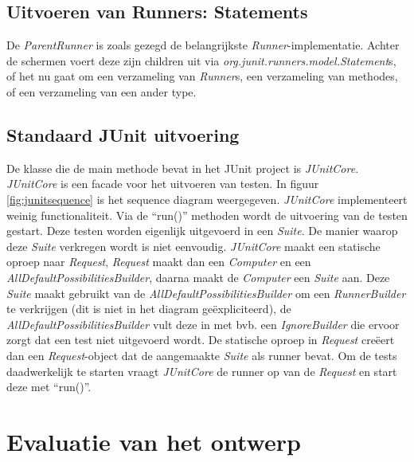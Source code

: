 \documentclass[i1]{oss}
\begin{document}
\subsection{Uitvoeren van Runners: Statements}

De \emph{ParentRunner} is zoals gezegd de belangrijkste \emph{Runner}-implementatie. Achter de schermen voert deze zijn children uit via \emph{org.junit.runners.model.Statement}s, of het nu gaat om een verzameling van \emph{Runner}s, een verzameling van methodes, of een verzameling van een ander type.

\subsection{}

\subsection{Standaard JUnit uitvoering}

De klasse die de main methode bevat in het JUnit project is \emph{JUnitCore}.
\emph{JUnitCore} is een facade voor het uitvoeren van testen.
In figuur \ref{fig:junitsequence} is het sequence diagram weergegeven.
\emph{JUnitCore} implementeert weinig functionaliteit.
Via de ``run()'' methoden wordt de uitvoering van de testen gestart.
Deze testen worden eigenlijk uitgevoerd in een \emph{Suite}.
De manier waarop deze \emph{Suite} verkregen wordt is niet eenvoudig.
\emph{JUnitCore} maakt een statische oproep naar \emph{Request},
\emph{Request} maakt dan een \emph{Computer} en een
\emph{AllDefaultPossibilitiesBuilder}, daarna maakt de \emph{Computer}
een \emph{Suite} aan.
Deze \emph{Suite} maakt gebruikt van de \emph{AllDefaultPossibilitiesBuilder}
om een \emph{RunnerBuilder} te verkrijgen (dit is niet in het diagram
ge\"expliciteerd), de \emph{AllDefaultPossibilitiesBuilder} vult deze in met
bvb. een \emph{IgnoreBuilder} die ervoor zorgt dat een test niet uitgevoerd
wordt.
De statische oproep in \emph{Request} cre\"eert dan een \emph{Request}-object
dat de aangemaakte \emph{Suite} als runner bevat.
Om de tests daadwerkelijk te starten vraagt \emph{JUnitCore} de runner op
van de \emph{Request} en start deze met ``run()''.





\section{Evaluatie van het ontwerp}
\end{document}
